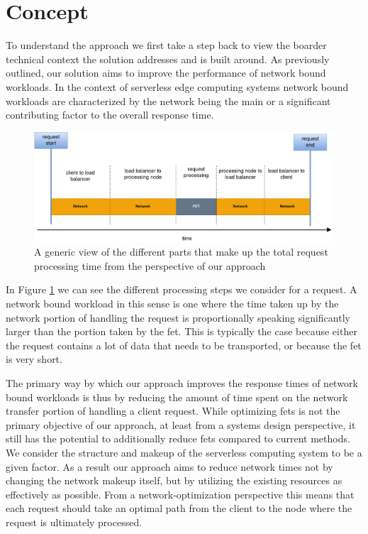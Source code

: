 \section{Concept}

To understand the approach we first take a step back to view the boarder technical context the solution addresses and is built around.
As previously outlined, our solution aims to improve the performance of network bound workloads.
In the context of serverless edge computing systems network bound workloads are characterized by the network being the main or a significant contributing factor to the overall response time.
\begin{figure}
    \centering
    \includegraphics[width=14cm]{graphics/diagrams/request_overview.png}
    \caption{A generic view of the different parts that make up the total request processing time from the perspective of our approach}
    \label{fig:request_net_fet_overview}
\end{figure}
In Figure \ref{fig:request_net_fet_overview} we can see the different processing steps we consider for a request.
A network bound workload in this sense is one where the time taken up by the network portion of handling the request is proportionally speaking significantly larger than the portion taken by the \gls{fet}.
This is typically the case because either the request contains a lot of data that needs to be transported, or because the \gls{fet} is very short.

The primary way by which our approach improves the response times of network bound workloads is thus by reducing the amount of time spent on the network transfer portion of handling a client request.
While optimizing \glspl{fet} is not the primary objective of our approach, at least from a systems design perspective, it still has the potential to additionally reduce \glspl{fet} compared to current methods.
We consider the structure and makeup of the serverless computing system to be a given factor. As a result our approach aims to reduce network times not by changing the network makeup itself, but by utilizing the existing resources as effectively as possible. From a network-optimization perspective this means that each request should take an optimal path from  the client to the node where the request is ultimately processed. 

